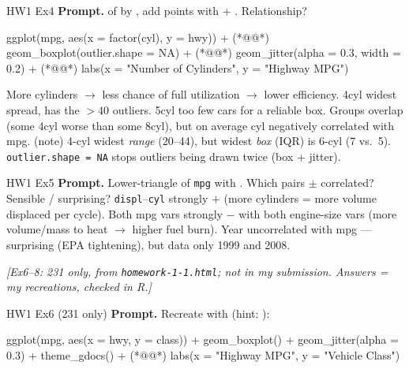 \begin{qbox}{HW1 Ex4}
\textbf{Prompt.}  of  by , add points with  + . Relationship?
\mine
\begin{rcode}
ggplot(mpg, aes(x = factor(cyl), y = hwy)) +  (*@@*)
  geom_boxplot(outlier.shape = NA) +  (*@@*)
  geom_jitter(alpha = 0.3, width = 0.2) +  (*@@*)
  labs(x = "Number of Cylinders", y = "Highway MPG")
\end{rcode}
More cylinders $\to$ less chance of full utilization $\to$ lower efficiency. 4cyl widest spread, has the $>40$ outliers. 5cyl too few cars for a reliable box. Groups overlap (some 4cyl worse than some 8cyl), but on average cyl negatively correlated with mpg.
\ans (note) 4-cyl widest \emph{range} (20--44), but widest \emph{box} (IQR) is 6-cyl (7 vs.\ 5). \texttt{outlier.shape = NA} stops outliers being drawn twice (box + jitter).
\end{qbox}

\begin{qbox}{HW1 Ex5}
\textbf{Prompt.} Lower-triangle  of \texttt{mpg} with . Which pairs $\pm$ correlated? Sensible / surprising?
\mine
{}
\texttt{displ}--\texttt{cyl} strongly $+$ (more cylinders = more volume displaced per cycle). Both mpg vars strongly $-$ with both engine-size vars (more volume/mass to heat $\to$ higher fuel burn). Year uncorrelated with mpg --- surprising (EPA tightening), but data only 1999 and 2008.
\end{qbox}

{\color{figgray}\itshape [Ex6--8: 231 only, from \texttt{homework-1-1.html}; not in my submission. Answers = my recreations, checked in R.]}

\begin{qbox}{HW1 Ex6 (231 only)}
\textbf{Prompt.} Recreate with  (hint: ):
\ans
\begin{rcode}
ggplot(mpg, aes(x = hwy, y = class)) +
  geom_boxplot() + geom_jitter(alpha = 0.3) +
  theme_gdocs() +  (*@@*)
  labs(x = "Highway MPG", y = "Vehicle Class")
\end{rcode}
\end{qbox}

